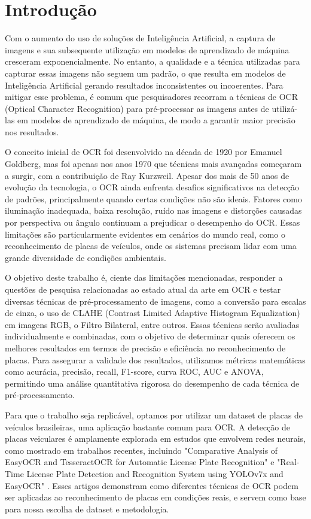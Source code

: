 \documentclass[conference]{IEEEtran}
\begin{document}
\section{Introdução}
Com o aumento do uso de soluções de Inteligência Artificial, a captura de imagens e sua subsequente utilização em modelos de aprendizado de máquina cresceram exponencialmente. No entanto, a qualidade e a técnica utilizadas para capturar essas imagens não seguem um padrão, o que resulta em modelos de Inteligência Artificial gerando resultados inconsistentes ou incoerentes. Para mitigar esse problema, é comum que pesquisadores recorram a técnicas de OCR (Optical Character Recognition) para pré-processar as imagens antes de utilizá-las em modelos de aprendizado de máquina, de modo a garantir maior precisão nos resultados.

O conceito inicial de OCR foi desenvolvido na década de 1920 por Emanuel Goldberg, mas foi apenas nos anos 1970 que técnicas mais avançadas começaram a surgir, com a contribuição de Ray Kurzweil. Apesar dos mais de 50 anos de evolução da tecnologia, o OCR ainda enfrenta desafios significativos na detecção de padrões, principalmente quando certas condições não são ideais. Fatores como iluminação inadequada, baixa resolução, ruído nas imagens e distorções causadas por perspectiva ou ângulo continuam a prejudicar o desempenho do OCR. Essas limitações são particularmente evidentes em cenários do mundo real, como o reconhecimento de placas de veículos, onde os sistemas precisam lidar com uma grande diversidade de condições ambientais.

O objetivo deste trabalho é, ciente das limitações mencionadas, responder a questões de pesquisa relacionadas ao estado atual da arte em OCR e testar diversas técnicas de pré-processamento de imagens, como a conversão para escalas de cinza, o uso de CLAHE (Contrast Limited Adaptive Histogram Equalization) em imagens RGB, o Filtro Bilateral, entre outros. Essas técnicas serão avaliadas individualmente e combinadas, com o objetivo de determinar quais oferecem os melhores resultados em termos de precisão e eficiência no reconhecimento de placas. Para assegurar a validade dos resultados, utilizamos métricas matemáticas como acurácia, precisão, recall, F1-score, curva ROC, AUC e ANOVA, permitindo uma análise quantitativa rigorosa do desempenho de cada técnica de pré-processamento.

Para que o trabalho seja replicável, optamos por utilizar um dataset de placas de veículos brasileiras, uma aplicação bastante comum para OCR. A detecção de placas veiculares é amplamente explorada em estudos que envolvem redes neurais, como mostrado em trabalhos recentes, incluindo "Comparative Analysis of EasyOCR and TesseractOCR for Automatic License Plate Recognition" \cite{b1} e "Real-Time License Plate Detection and Recognition System using YOLOv7x and EasyOCR" \cite{b2}. Esses artigos demonstram como diferentes técnicas de OCR podem ser aplicadas ao reconhecimento de placas em condições reais, e servem como base para nossa escolha de dataset e metodologia.
\end{document}

